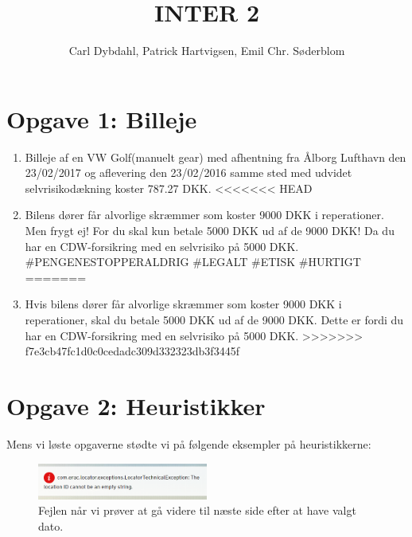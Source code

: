 \documentclass[a4paper]{article}
\title{INTER 2}
\author{Carl Dybdahl, Patrick Hartvigsen, Emil Chr. Søderblom}
\begin{document}
\maketitle

\section*{Opgave 1: Billeje}
\begin{enumerate}
\item Billeje af en VW Golf(manuelt gear) med afhentning fra Ålborg Lufthavn den 23/02/2017 og aflevering den 23/02/2016 samme sted med udvidet selvrisikodækning koster 787.27 DKK.
<<<<<<< HEAD
\item Bilens dører får alvorlige skræmmer som koster 9000 DKK i reperationer. Men frygt ej! For du skal kun betale 5000 DKK ud af de 9000 DKK! Da du har en CDW-forsikring med en selvrisiko på 5000 DKK. \#PENGENESTOPPERALDRIG \#LEGALT \#ETISK \#HURTIGT
=======
\item Hvis bilens dører får alvorlige skræmmer som koster 9000 DKK i reperationer, skal du betale 5000 DKK ud af de 9000 DKK. Dette er fordi du har en CDW-forsikring med en selvrisiko på 5000 DKK.
>>>>>>> f7e3cb47fc1d0c0cedadc309d332323db3f3445f
\end{enumerate}

\section*{Opgave 2: Heuristikker}

Mens vi løste opgaverne stødte vi på følgende eksempler på heuristikkerne:

\begin{figure}[!ht]
\centering
\includegraphics[width=0.5\textwidth]{error0.png}
\caption{Fejlen når vi prøver at gå videre til næste side efter at have valgt dato.}
\label{error-next}
\end{figure}
\end{document}
